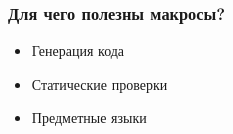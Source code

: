 \documentclass[svgnames,hyperref={bookmarks=false},11pt]{beamer}
\begin{document}
\begin{frame}[fragile]
\frametitle{}

\vskip40pt
\begin{center}
\end{center}
\end{frame}

\begin{frame}[fragile]
\frametitle{Для чего полезны макросы?}

\begin{itemize}
\item Генерация кода
\item Статические проверки
\item Предметные языки
\end{itemize}
\end{frame}
\end{document}
